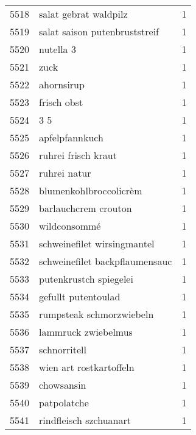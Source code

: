 \begin{tabular}{llr}
5518 &                              salat gebrat waldpilz &      1 \\
5519 &                      salat saison putenbruststreif &      1 \\
5520 &                                          nutella 3 &      1 \\
5521 &                                               zuck &      1 \\
5522 &                                         ahornsirup &      1 \\
5523 &                                        frisch obst &      1 \\
5524 &                                                3 5 &      1 \\
5525 &                                     apfelpfannkuch &      1 \\
5526 &                                ruhrei frisch kraut &      1 \\
5527 &                                       ruhrei natur &      1 \\
5528 &                             blumenkohlbroccolicrèm &      1 \\
5529 &                               barlauchcrem crouton &      1 \\
5530 &                                       wildconsommé &      1 \\
5531 &                        schweinefilet wirsingmantel &      1 \\
5532 &                     schweinefilet backpflaumensauc &      1 \\
5533 &                             putenkrustch spiegelei &      1 \\
5534 &                                gefullt putentoulad &      1 \\
5535 &                           rumpsteak schmorzwiebeln &      1 \\
5536 &                                lammruck zwiebelmus &      1 \\
5537 &                                       schnorritell &      1 \\
5538 &                            wien art rostkartoffeln &      1 \\
5539 &                                         chowsansin &      1 \\
5540 &                                        patpolatche &      1 \\
5541 &                             rindfleisch szchuanart &      1 \\

\end{tabular}

